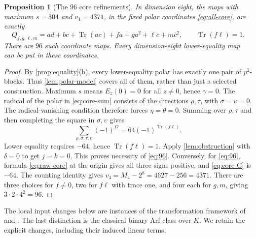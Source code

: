 \documentclass[11pt,a4paper]{article}
\newtheorem{proposition}[theorem]{Proposition}
\theoremstyle{definition}
\theoremstyle{remark}
\numberwithin{equation}{section}
\newcommand{\Tr}{\operatorname{Tr}}
\newcommand{\vfour}{v_4}
\begin{document}
\begin{proposition}[The \(96\) core refinements]\label{prop:96}
In dimension eight, the maps with maximum \(s=304\) and
\(\vfour=4371\), in the fixed polar coordinates
\eqref{eq:all-core}, are exactly
\begin{equation}\label{eq:96}
 Q_{f,g,\ell,m}=ad+bc+\Tr(ac)+fa+ga^2+\ell c+mc^2,
       \qquad \Tr(f\ell)=1.
\end{equation}
There are \(96\) such coordinate maps.
Every dimension-eight lower-equality map can be put in these
coordinates.
\end{proposition}
\begin{proof}
By \cref{prop:equality}(b), every lower-equality polar has exactly
one pair of \(p^2\)-blocks. Thus \cref{lem:polar-model} covers all of
them, rather than just a selected construction.
Maximum \(s\) means \(E_z(0)=0\) for all \(z\ne0\), hence \(\gamma=0\).
The radical of the polar in \eqref{eq:core-sum} consists of the
directions \(\rho,\tau\), with \(\sigma=\upsilon=0\).
The radical-vanishing condition therefore forces
\(\eta=\theta=0\).
Summing over \(\rho,\tau\) and then completing the square in
\(\sigma,\upsilon\) gives
\begin{equation}\label{eq:core-G}
 \sum_{\rho,\sigma,\tau,\upsilon}(-1)^D
       =64(-1)^{\Tr(f\ell)}.
\end{equation}
Lower equality requires \(-64\), hence \(\Tr(f\ell)=1\).
Apply \cref{lem:obstruction} with \(\delta=0\) to get \(j=k=0\).
This proves necessity of \eqref{eq:96}.
Conversely, for \eqref{eq:96}, formula \eqref{eq:raw-core} at the
origin gives all three signs positive, and \eqref{eq:core-G} is
\(-64\). The counting identity gives
\(\vfour=M_4-2^8=4627-256=4371\).
There are three choices for \(f\ne0\), two for \(f\ell\) with trace
one, and four each for \(g,m\), giving \(3\cdot2\cdot4^2=96\).
\end{proof}

The local input changes below are instances of the transformation
framework of \citep[Propositions 5--6, pp.~12--14]{MPG13} and
\citep[Propositions 4.5 and 4.7, p.~17]{PFMR14}.
The last distinction is the classical binary Arf class over \(K\).
We retain the explicit changes, including their induced linear terms.
\end{document}
